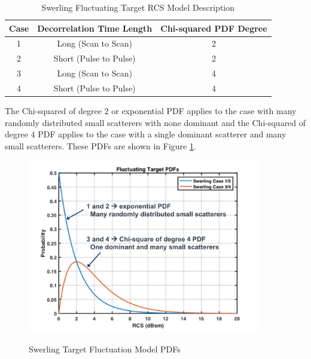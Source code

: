 \begin{table}[H]
  \begin{center}
      \renewcommand{\baselinestretch}{1} \small\normalsize
  \begin{quote}
    \caption[Swerling Fluctuating Target RCS Model Description]{Swerling Fluctuating Target RCS Model Description\label{env_tab:1}}
  \end{quote}
  \begin{tabular} {|c | c | c |}
    \hline
  \bf{Case} & \bf{Decorrelation Time Length} & \bf{Chi-squared PDF Degree} \\ \hline
  1 &Long (Scan to Scan) &2 \\ \hline
  2 &Short (Pulse to Pulse) &2 \\ \hline
  3 &Long (Scan to Scan) &4 \\ \hline
  4 &Short (Pulse to Pulse) &4 \\ \hline
\end{tabular}
\end{center}
\end{table}
\renewcommand{\baselinestretch}{2} \small\normalsize

The Chi-squared of degree $2$ or exponential PDF applies to the case with many randomly distributed small scatterers with none dominant and the Chi-squared of degree $4$ PDF applies to the case with a single dominant scatterer and many small scatterers. These PDFs are shown in Figure \ref{env_fig:4}.

\begin{figure}[H]
  \begin{center}
\includegraphics[width=4in]{../media/multistatic/swerling_pdfs.png}
  \end{center}
  \renewcommand{\baselinestretch}{1} \small\normalsize
  \begin{quote}
    \caption[Swerling Target Fluctuation Model PDFs]{Swerling Target Fluctuation Model PDFs\label{env_fig:4}}
  \end{quote}
\end{figure}
\renewcommand{\baselinestretch}{2} \small\normalsize

